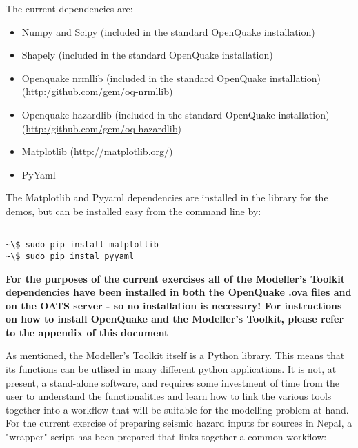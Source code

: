 The current dependencies are:
\begin{itemize}
\item Numpy and Scipy (included in the standard OpenQuake installation)
\item Shapely (included in the standard OpenQuake installation)
\item Openquake nrmllib (included in the standard OpenQuake installation) 
    \hfill \\ (\href{http:/github.com/gem/oq-nrmllib}{http:/github.com/gem/oq-nrmllib}) 
\item Openquake hazardlib (included in the standard OpenQuake installation) 
    \hfill \\ (\href{http:/github.com/gem/oq-hazardlib}{http:/github.com/gem/oq-hazardlib})
\item Matplotlib (\href{http://matplotlib.org/}{http://matplotlib.org/})
\item PyYaml
\end{itemize}

The Matplotlib and Pyyaml dependencies are installed in the library for the demos, but can be installed easy from the command line by:
\begin{Verbatim}[frame=single, commandchars=\\\{\}, fontsize=\scriptsize]

~\$ sudo pip install matplotlib
~\$ sudo pip instal pyyaml

\end{Verbatim}

\textbf{For the purposes of the current exercises all of the Modeller's Toolkit dependencies have been installed in both the OpenQuake .ova files and on the OATS server - so no installation is necessary! For instructions on how to install OpenQuake and the Modeller's Toolkit, please refer to the appendix of this document}

As mentioned, the Modeller's Toolkit itself is a Python library. This means that its functions can be utlised in many different python applications. It is not, at present, a stand-alone software, and requires some investment of time from the user to understand the functionalities and learn how to link the various tools together into a workflow that will be suitable for the modelling problem at hand. For the current exercise of preparing seismic hazard inputs for sources in Nepal, a "wrapper" script has been prepared that links together a common workflow: 

